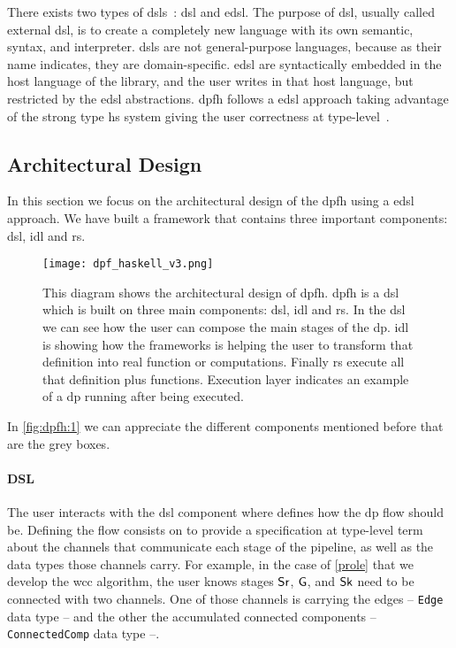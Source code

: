 There exists two types of \acrlong{dsl}s~\cite{dsl}: \acrlong{dsl} and \acrfull{edsl}. The purpose of \acrshort{dsl}, usually called external \acrshort{dsl}, is to create a completely new language with its own semantic, syntax, and interpreter. 
\acrshort{dsl}s are not general-purpose languages, because as their name indicates, they are domain-specific. \acrshort{edsl} are syntactically embedded in the host language of the library, and the user writes in that host language, but restricted by the \acrshort{edsl} abstractions.
\acrshort{dpfh} follows a \acrshort{edsl} approach taking advantage of the strong type \acrshort{hs} system giving the user correctness at type-level~\cite{curryhoward}.

\subsection{Architectural Design}
In this section we focus on the architectural design of the \acrshort{dpfh} using a \acrshort{edsl} approach. We have built a framework that contains
three important components: \acrshort{dsl}, \acrshort{idl} and \acrshort{rs}. 

\begin{figure}[!ht]
  \centering
   \texttt{[image: dpf\_haskell\_v3.png]}
    \caption[{[\acrshort{dpfh}] Architectural design of \acrshort{dpfh}}]{This diagram shows the architectural design of \acrshort{dpfh}. \acrshort{dpfh} is a \acrshort{dsl} which is built on three main components: \acrshort{dsl}, \acrshort{idl} and \acrshort{rs}. In the \acrshort{dsl} we can see how the user can compose the main stages of the \acrshort{dp}. \acrshort{idl} is showing how the frameworks is helping the user to transform that definition into real function or computations. Finally \acrshort{rs} execute all that definition plus functions. Execution layer indicates an example of a \acrshort{dp} running after being executed.}
    \label{fig:dpfh:1}
\end{figure}

In \autoref{fig:dpfh:1} we can appreciate the different components mentioned before that are the grey boxes.

\paragraph{DSL} The user interacts with the \acrshort{dsl} component where defines how the \acrshort{dp} flow
should be. Defining the flow consists on to provide a specification at type-level term about the channels that communicate each stage of the pipeline, as well as the data types those channels carry. 
For example, in the case of \autoref{prole} that we develop the \acrshort{wcc} algorithm, the user knows stages $\mathsf{Sr}$, $\mathsf{G}$, and $\mathsf{Sk}$ need to be connected with two channels. 
One of those channels is carrying the edges -- \texttt{Edge} data type -- and the other the accumulated connected components -- \texttt{ConnectedComp} data type --. 

